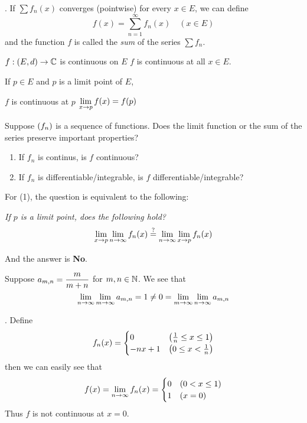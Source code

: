 . If \(\sum f_n(x)\) converges (pointwise) for every \(x \in E\), we can define
\[
    f(x) = \sum_{n=1}^\infty f_n(x) \quad (x \in E)
\]
and the function \(f\) is called the \textit{sum} of the series \(\sum f_n\).

\recall \(f: (E, d) \rightarrow \mathbb{C}\) is continuous on \(E\) \miff \(f\) is continuous at all \(x \in E\).

\recall {} If \(p \in E\) and \(p\) is a limit point of \(E\),
\begin{center}
    \(f\) is continuous at \(p\) \miff \(\displaystyle \lim_{x \rightarrow p} f(x) = f(p)\)
\end{center}

\question Suppose \(\left( f_n \right)\) is a sequence of functions. Does the limit function or the sum of the series preserve important properties?
\begin{enumerate}
    \item If \(f_n\) is continus, is \(f\) continuous?
    \item If \(f_n\) is differentiable/integrable, is \(f\) differentiable/integrable?
\end{enumerate}

For (1), the question is equivalent to the following:

\textit{If \(p\) is a limit point, does the following hold?}
\[
    \lim_{x\rightarrow p} \lim_{n\rightarrow \infty} f_n(x) \overset{?}{=} \lim_{n\rightarrow \infty} \lim_{x\rightarrow p}f_n(x)
\]

And the answer is \textbf{No}.

 Suppose \(\displaystyle a_{m, n} = \frac{m}{m + n}\) for \(m, n\in \mathbb{N}\). We see that
\[
    \lim_{n \rightarrow \infty} \lim_{m \rightarrow \infty} a_{m, n} = 1 \neq 0 = \lim_{m \rightarrow \infty} \lim_{n \rightarrow \infty} a_{m, n}
\]

\ex. Define
\[
    f_n(x) = \begin{cases}
        0 & \left( \frac{1}{n} \leq x \leq 1 \right) \\
        -nx + 1 & \left( 0 \leq x < \frac{1}{n} \right)
    \end{cases}
\]
then we can easily see that
\[
    f(x) = \lim_{n\rightarrow \infty} f_n(x) = \begin{cases}
        0 & (0 < x \leq 1) \\
        1 & (x = 0)
    \end{cases}
\]
Thus \(f\) is not continuous at \(x = 0\).


